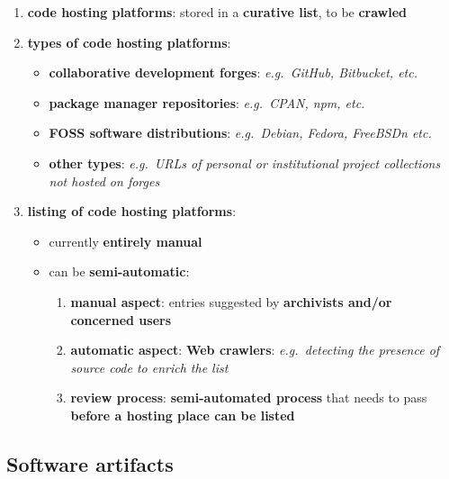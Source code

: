 \documentclass[11pt]{article}
\providecommand{\tightlist}{%
      \setlength{\itemsep}{0pt}\setlength{\parskip}{0pt}}
\begin{document}
\begin{enumerate}
\def\labelenumi{\arabic{enumi}.}
\tightlist
\item
  \textbf{code hosting platforms}: stored in a \textbf{curative list},
  to be \textbf{crawled}
\item
  \textbf{types of code hosting platforms}:

  \begin{itemize}
  \tightlist
  \item
    \textbf{collaborative development forges}: \emph{e.g.~GitHub,
    Bitbucket, etc.}
  \item
    \textbf{package manager repositories}: \emph{e.g.~CPAN, npm, etc.}
  \item
    \textbf{FOSS software distributions}: \emph{e.g.~Debian, Fedora,
    FreeBSDn etc.}
  \item
    \textbf{other types}: \emph{e.g.~URLs of personal or institutional
    project collections not hosted on forges}
  \end{itemize}
\item
  \textbf{listing of code hosting platforms}:

  \begin{itemize}
  \tightlist
  \item
    currently \textbf{entirely manual}
  \item
    can be \textbf{semi-automatic}:

    \begin{enumerate}
    \def\labelenumii{\arabic{enumii}.}
    \tightlist
    \item
      \textbf{manual aspect}: entries suggested by \textbf{archivists
      and/or concerned users}
    \item
      \textbf{automatic aspect}: \textbf{Web crawlers}:
      \emph{e.g.~detecting the presence of source code to enrich the
      list}
    \item
      \textbf{review process}: \textbf{semi-automated process} that
      needs to pass \textbf{before a hosting place can be listed}
    \end{enumerate}
  \end{itemize}
\end{enumerate}

\hypertarget{software-artifacts}{%
\subsection{Software artifacts}\label{software-artifacts}}
\end{document}
